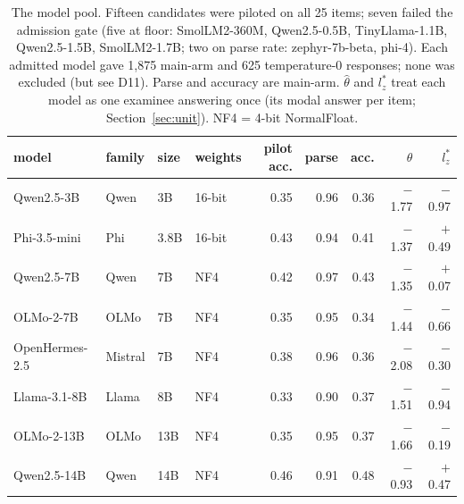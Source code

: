 \begin{table}[t]
\caption{The model pool. Fifteen candidates were piloted on all 25 items; seven failed the admission gate (five at floor: SmolLM2-360M, Qwen2.5-0.5B, TinyLlama-1.1B, Qwen2.5-1.5B, SmolLM2-1.7B; two on parse rate: zephyr-7b-beta, phi-4). Each admitted model gave 1{,}875 main-arm and 625 temperature-0 responses; none was excluded (but see D11). Parse and accuracy are main-arm. $\hat\theta$ and $l_z^*$ treat each model as one examinee answering once (its modal answer per item; Section~\ref{sec:unit}). NF4 = 4-bit NormalFloat.}
\label{tab:models}\centering
\begin{tabular}{llllrrrrr}\toprule
model & family & size & weights & pilot acc. & parse & acc. & $\hat\theta$ & $l_z^*$ \\\midrule
Qwen2.5-3B & Qwen & 3B & 16-bit & 0.35 & 0.96 & 0.36 & $-$1.77 & $-$0.97 \\
Phi-3.5-mini & Phi & 3.8B & 16-bit & 0.43 & 0.94 & 0.41 & $-$1.37 & $+$0.49 \\
Qwen2.5-7B & Qwen & 7B & NF4 & 0.42 & 0.97 & 0.43 & $-$1.35 & $+$0.07 \\
OLMo-2-7B & OLMo & 7B & NF4 & 0.35 & 0.95 & 0.34 & $-$1.44 & $-$0.66 \\
OpenHermes-2.5 & Mistral & 7B & NF4 & 0.38 & 0.96 & 0.36 & $-$2.08 & $-$0.30 \\
Llama-3.1-8B & Llama & 8B & NF4 & 0.33 & 0.90 & 0.37 & $-$1.51 & $-$0.94 \\
OLMo-2-13B & OLMo & 13B & NF4 & 0.35 & 0.95 & 0.37 & $-$1.66 & $-$0.19 \\
Qwen2.5-14B & Qwen & 14B & NF4 & 0.46 & 0.91 & 0.48 & $-$0.93 & $+$0.47 \\
\bottomrule\end{tabular}\end{table}
